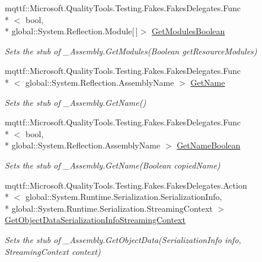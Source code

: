 \begin{DoxyCompactItemize}
mqttf\-::\-Microsoft.\-Quality\-Tools.\-Testing.\-Fakes.\-Fakes\-Delegates.\-Func\\*
$<$ bool, \\*
global\-::\-System.\-Reflection.\-Module\mbox{[}$\,$\mbox{]}$>$ \hyperlink{class_system_1_1_runtime_1_1_interop_services_1_1_fakes_1_1_stub___assembly_a1a2f8d82e2d5ab85f748abfe4fb5e3c0}{Get\-Modules\-Boolean}
\begin{DoxyCompactList}\small\item\em Sets the stub of \-\_\-\-Assembly.\-Get\-Modules(\-Boolean get\-Resource\-Modules)\end{DoxyCompactList}\item 
mqttf\-::\-Microsoft.\-Quality\-Tools.\-Testing.\-Fakes.\-Fakes\-Delegates.\-Func\\*
$<$ global\-::\-System.\-Reflection.\-Assembly\-Name $>$ \hyperlink{class_system_1_1_runtime_1_1_interop_services_1_1_fakes_1_1_stub___assembly_aebbad2f4aec00b39738f35f8a3b69eb6}{Get\-Name}
\begin{DoxyCompactList}\small\item\em Sets the stub of \-\_\-\-Assembly.\-Get\-Name()\end{DoxyCompactList}\item 
mqttf\-::\-Microsoft.\-Quality\-Tools.\-Testing.\-Fakes.\-Fakes\-Delegates.\-Func\\*
$<$ bool, \\*
global\-::\-System.\-Reflection.\-Assembly\-Name $>$ \hyperlink{class_system_1_1_runtime_1_1_interop_services_1_1_fakes_1_1_stub___assembly_a039a10b8a1983925556ab1dda25231b8}{Get\-Name\-Boolean}
\begin{DoxyCompactList}\small\item\em Sets the stub of \-\_\-\-Assembly.\-Get\-Name(\-Boolean copied\-Name)\end{DoxyCompactList}\item 
mqttf\-::\-Microsoft.\-Quality\-Tools.\-Testing.\-Fakes.\-Fakes\-Delegates.\-Action\\*
$<$ global\-::\-System.\-Runtime.\-Serialization.\-Serialization\-Info, \\*
global\-::\-System.\-Runtime.\-Serialization.\-Streaming\-Context $>$ \hyperlink{class_system_1_1_runtime_1_1_interop_services_1_1_fakes_1_1_stub___assembly_a97a43284d8c0ae3d29f00a837f759904}{Get\-Object\-Data\-Serialization\-Info\-Streaming\-Context}
\begin{DoxyCompactList}\small\item\em Sets the stub of \-\_\-\-Assembly.\-Get\-Object\-Data(\-Serialization\-Info info, Streaming\-Context context)\end{DoxyCompactList}\item 

\end{DoxyCompactItemize}
